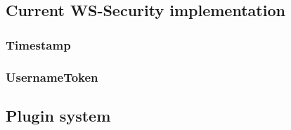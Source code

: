 \subsection{Current WS-Security implementation}

\subsubsection{Timestamp}


\subsubsection{UsernameToken}
\label{sudsUsernameToken}


\subsection{Plugin system}
\label{sudsPlugins}

